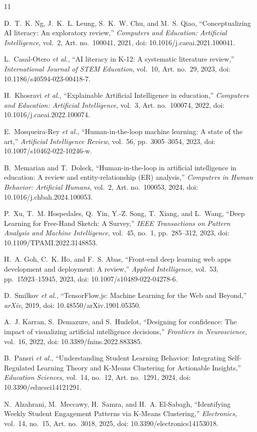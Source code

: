 \documentclass[12pt,oneside]{report}
\begin{document}
\begin{thebibliography}{11}

D.~T.~K. Ng, J.~K.~L. Leung, S.~K.~W. Chu, and M.~S. Qiao, ``Conceptualizing AI literacy: An exploratory review,'' \textit{Computers and Education: Artificial Intelligence}, vol.~2, Art. no.~100041, 2021, doi: 10.1016/j.caeai.2021.100041.

L.~Casal-Otero \textit{et al.}, ``AI literacy in K-12: A systematic literature review,'' \textit{International Journal of STEM Education}, vol.~10, Art. no.~29, 2023, doi: 10.1186/s40594-023-00418-7.

H.~Khosravi \textit{et al.}, ``Explainable Artificial Intelligence in education,'' \textit{Computers and Education: Artificial Intelligence}, vol.~3, Art. no.~100074, 2022, doi: 10.1016/j.caeai.2022.100074.

E.~Mosqueira-Rey \textit{et al.}, ``Human-in-the-loop machine learning: A state of the art,'' \textit{Artificial Intelligence Review}, vol.~56, pp.~3005--3054, 2023, doi: 10.1007/s10462-022-10246-w.

B.~Memarian and T.~Doleck, ``Human-in-the-loop in artificial intelligence in education: A review and entity-relationship (ER) analysis,'' \textit{Computers in Human Behavior: Artificial Humans}, vol.~2, Art. no.~100053, 2024, doi: 10.1016/j.chbah.2024.100053.

P.~Xu, T.~M. Hospedales, Q.~Yin, Y.-Z. Song, T.~Xiang, and L.~Wang, ``Deep Learning for Free-Hand Sketch: A Survey,'' \textit{IEEE Transactions on Pattern Analysis and Machine Intelligence}, vol.~45, no.~1, pp.~285--312, 2023, doi: 10.1109/TPAMI.2022.3148853.

H.~A. Goh, C.~K. Ho, and F.~S. Abas, ``Front-end deep learning web apps development and deployment: A review,'' \textit{Applied Intelligence}, vol.~53, pp.~15923--15945, 2023, doi: 10.1007/s10489-022-04278-6.

D.~Smilkov \textit{et al.}, ``TensorFlow.js: Machine Learning for the Web and Beyond,'' \textit{arXiv}, 2019, doi: 10.48550/arXiv.1901.05350.

A.~J. Karran, S.~Demazure, and S.~Hudelot, ``Designing for confidence: The impact of visualizing artificial intelligence decisions,'' \textit{Frontiers in Neuroscience}, vol.~16, 2022, doi: 10.3389/fnins.2022.883385.

B.~Pansri \textit{et al.}, ``Understanding Student Learning Behavior: Integrating Self-Regulated Learning Theory and K-Means Clustering for Actionable Insights,'' \textit{Education Sciences}, vol.~14, no.~12, Art. no.~1291, 2024, doi: 10.3390/educsci14121291.

N.~Alzahrani, M.~Meccawy, H.~Samra, and H.~A. El-Sabagh, ``Identifying Weekly Student Engagement Patterns via K-Means Clustering,'' \textit{Electronics}, vol.~14, no.~15, Art. no.~3018, 2025, doi: 10.3390/electronics14153018.

\end{thebibliography}
\end{document}
